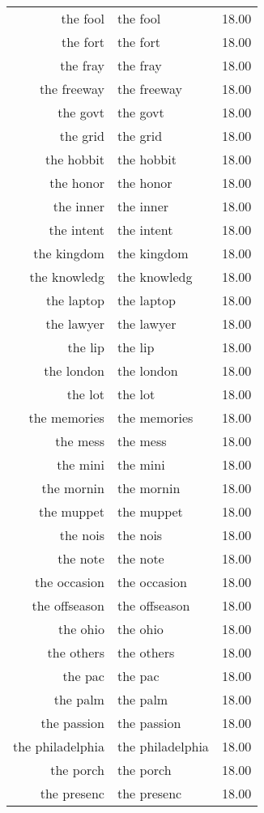 \begin{table}[ht]
\begin{tabular}{rlr}
  the fool & the fool & 18.00 \\ 
  the fort & the fort & 18.00 \\ 
  the fray & the fray & 18.00 \\ 
  the freeway & the freeway & 18.00 \\ 
  the govt & the govt & 18.00 \\ 
  the grid & the grid & 18.00 \\ 
  the hobbit & the hobbit & 18.00 \\ 
  the honor & the honor & 18.00 \\ 
  the inner & the inner & 18.00 \\ 
  the intent & the intent & 18.00 \\ 
  the kingdom & the kingdom & 18.00 \\ 
  the knowledg & the knowledg & 18.00 \\ 
  the laptop & the laptop & 18.00 \\ 
  the lawyer & the lawyer & 18.00 \\ 
  the lip & the lip & 18.00 \\ 
  the london & the london & 18.00 \\ 
  the lot & the lot & 18.00 \\ 
  the memories & the memories & 18.00 \\ 
  the mess & the mess & 18.00 \\ 
  the mini & the mini & 18.00 \\ 
  the mornin & the mornin & 18.00 \\ 
  the muppet & the muppet & 18.00 \\ 
  the nois & the nois & 18.00 \\ 
  the note & the note & 18.00 \\ 
  the occasion & the occasion & 18.00 \\ 
  the offseason & the offseason & 18.00 \\ 
  the ohio & the ohio & 18.00 \\ 
  the others & the others & 18.00 \\ 
  the pac & the pac & 18.00 \\ 
  the palm & the palm & 18.00 \\ 
  the passion & the passion & 18.00 \\ 
  the philadelphia & the philadelphia & 18.00 \\ 
  the porch & the porch & 18.00 \\ 
  the presenc & the presenc & 18.00 \\ 

\end{tabular}
\end{table}

